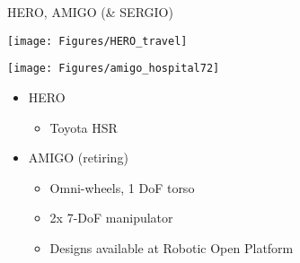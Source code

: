 \documentclass[12pt,a4paper]{article}
\newcommand{\emptylogo}{\texttt{[image: Figures/Empty]}}
\begin{document}
\begin{slidetop}


\begin{multicols}{2}

\begin{bclogo}[couleur = white, arrondi = 0.25, couleurBord = tuedarkblue , barre = none, logo=\emptylogo]{\textcolor{tuedarkblue}{HERO, AMIGO (\& SERGIO)}}
\medskip %
\begin{minipage}[T]{0.48\linewidth}
	\begin{center}
		\texttt{[image: Figures/HERO\_travel]}
	\end{center}
\end{minipage}
\hfill
\begin{minipage}[T]{0.48\linewidth}
	\begin{center}
		\texttt{[image: Figures/amigo\_hospital72]}
	\end{center}
\end{minipage}
    \begin{itemize}[itemsep = 0pt, parsep = 0pt, leftmargin=15pt]
        \item HERO
        \begin{itemize}[itemsep = 0pt, parsep = 0pt, leftmargin=15pt]
            \item Toyota HSR
        \end{itemize}
        \item AMIGO (retiring)
            \begin{itemize}[itemsep = 0pt, parsep = 0pt, leftmargin=15pt]
            \item Omni-wheels, 1 DoF torso
            \item 2x 7-DoF manipulator
            \item Designs available at Robotic Open Platform
        \end{itemize}
    \end{itemize}
\end{bclogo}


\end{multicols}
\end{slidetop}
\end{document}
